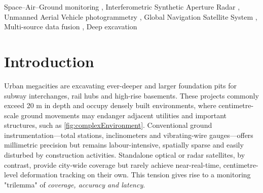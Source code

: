 \documentclass[preprint,11pt,authoryear,3p]{elsarticle}
\begin{document}
\begin{frontmatter}
\begin{abstract}
\end{abstract}



\begin{keyword}


Space--Air--Ground monitoring \sep
Interferometric Synthetic Aperture Radar  \sep
Unmanned Aerial Vehicle photogrammetry \sep
Global Navigation Satellite System \sep
Multi-source data fusion \sep
Deep excavation
\end{keyword}

\end{frontmatter}

\linenumbers

\section{Introduction}

Urban megacities are excavating ever-deeper and larger foundation pits for subway interchanges, rail hubs and high-rise basements\citep{gong2019advances}. These projects commonly exceed 20 m in depth and occupy densely built environments, where centimetre-scale ground movements may endanger adjacent utilities and important structures, such as \autoref{fig:complexEnvironment}. Conventional ground instrumentation—total stations, inclinometers and vibrating-wire gauges—offers millimetric precision but remains labour-intensive, spatially sparse and easily disturbed by construction activities. Standalone optical or radar satellites, by contrast, provide city-wide coverage but rarely achieve near-real-time, centimetre-level deformation tracking on their own. This tension gives rise to a monitoring "trilemma" of \emph{coverage, accuracy and latency}.
\end{document}
